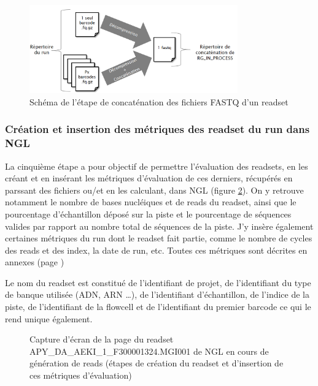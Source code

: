 \begin{figure}[H]
    \centering
    \includegraphics[width=0.8\textwidth]{img/Schéma_concaténation.png}
    \caption{\footnotesize{Schéma de l'étape de \og concaténation\fg{} des fichiers FASTQ d'un readset}}
    \label{schema-concat-fastq}
\end{figure}

\subsubsection*{Création et insertion des métriques des readset du run dans NGL}
La cinquième étape a pour objectif de permettre l'évaluation des readsets, en les créant et en insérant les métriques d'évaluation de ces derniers, récupérés en parssant des fichiers ou/et en les calculant, dans NGL (figure \ref{NGL-screenshot_readset}).
On y retrouve notamment le nombre de bases nucléiques et de reads du readset, ainsi que le pourcentage d'échantillon déposé sur la piste et le pourcentage de séquences valides par rapport au nombre total de séquences de la piste.
J'y insère également certaines métriques du run dont le readset fait partie, comme le nombre de cycles des reads et des index, la date de run, etc. Toutes ces métriques sont décrites en annexes (page \pageref{anexes3})

Le nom du readset est constitué de l'identifiant de projet, de l'identifiant du type de banque utilisée (ADN, ARN \dots), de l'identifiant d'échantillon, de l'indice de la piste, de l'identifiant de la flowcell et de l'identifiant du premier barcode ce qui le rend unique également.

\begin{figure}[H]
    \centering
    \caption{\footnotesize{Capture d'écran de la page du readset APY\_DA\_AEKI\_1\_F300001324.MGI001 de NGL en cours de génération de reads (étapes de création du readset et d'insertion de ces métriques d'évaluation)}}
    \label{NGL-screenshot_readset}
\end{figure}

